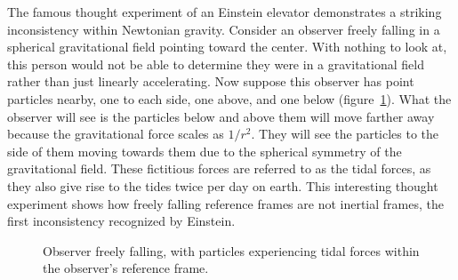 The famous thought experiment of an Einstein elevator demonstrates a striking inconsistency within Newtonian gravity. Consider an observer freely falling in a spherical gravitational field pointing toward the center. With nothing to look at, this person would not be able to determine they were in a gravitational field rather than just linearly accelerating. Now suppose this observer has point particles nearby, one to each side, one above, and one below (figure~\ref{fig:tidal_forces}). What the observer will see is the particles below and above them will move farther away because the gravitational force scales as $1/r^2$. They will see the particles to the side of them moving towards them due to the spherical symmetry of the gravitational field. These fictitious forces are referred to as the tidal forces, as they also give rise to the tides twice per day on earth. This interesting thought experiment shows how freely falling reference frames are not inertial frames, the first inconsistency recognized by Einstein. 
\begin{figure}
    \centering
    \caption{Observer freely falling, with particles experiencing tidal forces within the observer's reference frame.}
    \label{fig:tidal_forces}
\end{figure}

